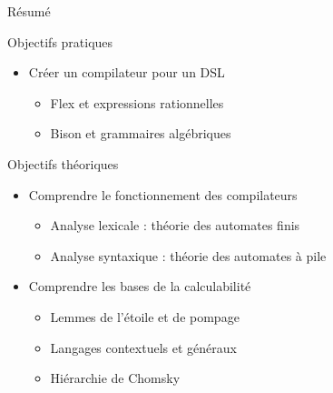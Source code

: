 
\begingroup

\begin{frame}{Résumé}
  \begin{block}{Objectifs pratiques}
    \begin{itemize}
    \item Créer un compilateur pour un DSL 
      \begin{itemize}
      \item Flex et expressions rationnelles
      \item Bison et grammaires algébriques
      \end{itemize}
    \end{itemize}
  \end{block}
 
  \begin{block}{Objectifs théoriques}
    \begin{itemize}
    \item Comprendre le fonctionnement des compilateurs
      \begin{itemize}
      \item Analyse lexicale : théorie des automates finis
      \item Analyse syntaxique : théorie des automates à pile 
      \end{itemize}
    \item Comprendre les bases de la calculabilité
      \begin{itemize}
      \item Lemmes de l'étoile et de pompage 
      \item Langages contextuels et généraux
      \item Hiérarchie de Chomsky
      \end{itemize}
    \end{itemize}
  \end{block}
\end{frame}


\endgroup
